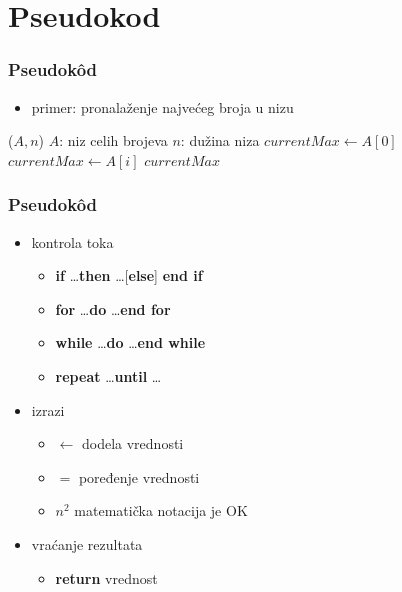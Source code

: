 \documentclass[compress]{beamer}
\begin{document}
\section[Pseudokôd]{Pseudokod}
\begin{frame}[fragile]
  \frametitle{Pseudokôd}
  \begin{itemize}
    \item primer: pronalaženje najvećeg broja u nizu
  \end{itemize}
\begin{algorithmic}
\STATE {}($A,n$)
\REQUIRE $A$: niz celih brojeva
\REQUIRE $n$: dužina niza
\STATE $currentMax \leftarrow A[0]$
    \STATE $currentMax \leftarrow A[i]$
  \ENDIF
\ENDFOR
\RETURN $currentMax$
\end{algorithmic}
\end{frame}
\begin{frame}[fragile]
  \frametitle{Pseudokôd}
  \begin{itemize}
    \item kontrola toka
    \begin{itemize}
      \item \textbf{if} \ldots \textbf{then} \ldots [\textbf{else}] \textbf{end
      if} 
      \item \textbf{for} \ldots \textbf{do} \ldots \textbf{end for} 
      \item \textbf{while} \ldots \textbf{do} \ldots \textbf{end while} 
      \item \textbf{repeat} \ldots \textbf{until} \ldots 
    \end{itemize}
    \item izrazi 
    \begin{itemize}
      \item $\leftarrow$ dodela vrednosti 
      \item $=$ poređenje vrednosti 
      \item $n^2$ matematička notacija je OK 
    \end{itemize}
    \item vraćanje rezultata
    \begin{itemize}
      \item \textbf{return} vrednost 
    \end{itemize}
  \end{itemize}
\end{frame}
\end{document}
